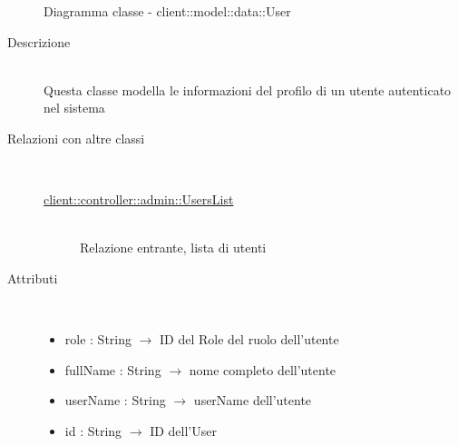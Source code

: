 \vspace{0.5cm}
\hypertarget{client::model::data::User}{}
\begin{figure}[H]
	\centering
	\caption{Diagramma classe - client::model::data::User}
\end{figure}\begin{description}
\item[Descrizione] \hfill \\
Questa classe modella le informazioni del profilo di un utente autenticato nel sistema
\item[Relazioni con altre classi] \hfill \\
\vspace{-7mm}
\begin{description}
	\item[\hyperlink{client::controller::admin::UsersList}{client::controller::admin::UsersList}] \hfill \\
	Relazione entrante, lista di utenti
\end{description}

\item[Attributi] \hfill \\
\vspace{-7mm}
\begin{itemize}
	\item role : String $\rightarrow$ ID del Role del ruolo dell'utente
	\item fullName : String $\rightarrow$ nome completo dell'utente
	\item userName : String $\rightarrow$ userName dell'utente
	\item id : String $\rightarrow$ ID dell'User
\end{itemize}


\end{description}
